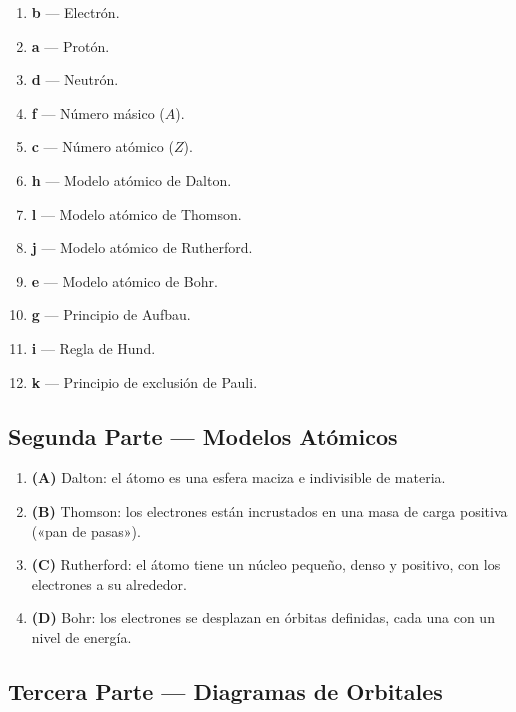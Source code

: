 \documentclass[12pt, letterpaper]{article}
\begin{document}
  \begin{enumerate}[leftmargin=*, label=\textbf{\arabic*.}]
    \item \textbf{b} — Electrón.
    \item \textbf{a} — Protón.
    \item \textbf{d} — Neutrón.
    \item \textbf{f} — Número másico ($A$).
    \item \textbf{c} — Número atómico ($Z$).
    \item \textbf{h} — Modelo atómico de Dalton.
    \item \textbf{l} — Modelo atómico de Thomson.
    \item \textbf{j} — Modelo atómico de Rutherford.
    \item \textbf{e} — Modelo atómico de Bohr.
    \item \textbf{g} — Principio de Aufbau.
    \item \textbf{i} — Regla de Hund.
    \item \textbf{k} — Principio de exclusión de Pauli.
  \end{enumerate}

  \newpage

  \subsection*{Segunda Parte — Modelos Atómicos}

  \begin{enumerate}[leftmargin=*, label=\textbf{\arabic*.}]
    \item \textbf{(A)} Dalton: el átomo es una esfera maciza e indivisible de materia.
    \item \textbf{(B)} Thomson: los electrones están incrustados en una masa de carga positiva («pan de pasas»).
    \item \textbf{(C)} Rutherford: el átomo tiene un núcleo pequeño, denso y positivo, con los electrones a su alrededor.
    \item \textbf{(D)} Bohr: los electrones se desplazan en órbitas definidas, cada una con un nivel de energía.
  \end{enumerate}

  \subsection*{Tercera Parte — Diagramas de Orbitales}
\end{document}

